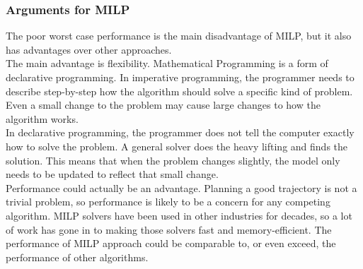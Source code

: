 \subsubsection{Arguments for MILP}
The poor worst case performance is the main disadvantage of MILP, but it also has advantages over other approaches. \\
The main advantage is flexibility. Mathematical Programming is a form of declarative programming. In imperative programming, the programmer needs to describe step-by-step how the algorithm should solve a specific kind of problem. Even a small change to the problem may cause large changes to how the algorithm works.\\
In declarative programming, the programmer does not tell the computer exactly how to solve the problem. A general solver does the heavy lifting and finds the solution. This means that when the problem changes slightly, the model only needs to be updated to reflect that small change. \\
Performance could actually be an advantage. Planning a good trajectory is not a trivial problem, so performance is likely to be a concern for any competing algorithm. MILP solvers have been used in other industries for decades, so a lot of work has gone in to making those solvers fast and memory-efficient. The performance of MILP approach could be comparable to, or even exceed, the performance of other algorithms.

